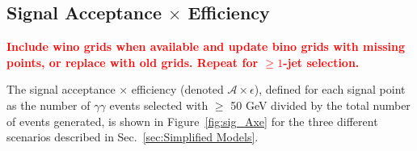 \documentclass[dissertation.tex]{subfiles}
\begin{document}
\subsection{Signal Acceptance $\times$ Efficiency}
\label{sec:Signal Acceptance Times Efficiency}

\textcolor{red}{\textbf{Include wino grids when available and update bino grids with missing points, or replace with old grids.  Repeat for $\geq1$-jet selection.}}

The signal acceptance $\times$ efficiency (denoted $\mathcal{A}\times\epsilon$), defined for each signal point as the number of $\gamma\gamma$ events selected with \MET $\geq$ 50 GeV divided by the total number of events generated, is shown in Figure~\ref{fig:sig_Axe} for the three different scenarios described in Sec.~\ref{sec:Simplified Models}.
\end{document}
